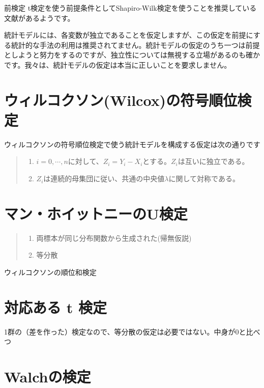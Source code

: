 \begin{SMbox}{前検定}
t検定を使う前提条件としてShapiro-Wilk検定を使うことを推奨している文献があるようです。


統計モデルには、各変数が独立であることを仮定しますが、この仮定を前提にする統計的な手法の利用は推奨されてません。統計モデルの仮定のうち一つは前提としようと努力をするのですが、独立性については無視する立場があるのも確かです。我々は、統計モデルの仮定は本当に正しいことを要求しません。
\end{SMbox}
\fi





\section{ウィルコクソン(Wilcox)の符号順位検定}
ウィルコクソンの符号順位検定で使う統計モデルを構成する仮定は次の通りです
\begin{quote}
    \begin{enumerate}[(1)]
\item $i=0,\cdots,n$に対して、$Z_i=Y_i-X_i$とする。$Z_i$は互いに独立である。
\item $Z_i$は連続的母集団に従い、共通の中央値$\lambda$に関して対称である。
\end{enumerate}
\end{quote}  





\section{マン・ホイットニーのU検定}
\begin{quote}
    \begin{enumerate}[(1)]
\item 両標本が同じ分布関数から生成された(帰無仮説)
\item 等分散
\end{enumerate}
\end{quote}
ウィルコクソンの順位和検定



\section{対応ある t 検定}
1群の（差を作った）検定なので、等分散の仮定は必要ではない。中身が0と比べつ


\section{Walchの検定}

